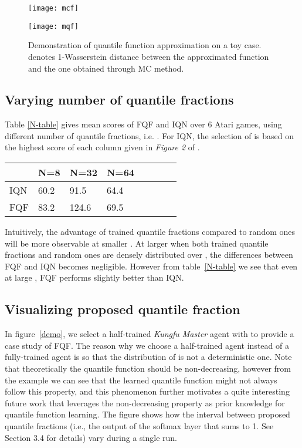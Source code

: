 \documentclass{article}
\begin{document}
\begin{figure}[!htb]
   \begin{minipage}{0.48\textwidth}
     \centering
     \texttt{[image: mcf]}
     \caption*{(a)}
   \end{minipage}\hfill
   \begin{minipage}{0.48\textwidth}
     \centering
     \texttt{[image: mqf]}
     \caption*{(b)}
   \end{minipage}
   \caption{Demonstration of quantile function approximation on a toy case.  denotes 1-Wasserstein distance between the approximated function and the one obtained through MC method.}
   \label{fig:toy}
\end{figure}

\subsection*{Varying number of quantile fractions}
Table \ref{N-table} gives mean scores of FQF and IQN over 6 Atari games, using different number of quantile fractions, i.e. . For IQN, the selection of  is based on the highest score of each column given in \textit{Figure 2} of \citep{dabney2018implicit}. 

\begin{table*}[ht!]
	\centering
    \begin{tabular}{llllllll}
		\hline \hline
		& N=8 & N=32 & N=64\\
		\midrule
		IQN & 60.2 & 91.5 & 64.4\\
		FQF & 83.2 & 124.6 & 69.5
	\end{tabular}
\caption{Mean scores across 6 Atari 2600 games, measured as percentages of human baseline. Scores are averages over 3 seeds.} \label{N-table}
\end{table*}

Intuitively, the advantage of trained quantile fractions compared to random ones will be more observable at smaller . At larger  when both trained quantile fractions and random ones are densely distributed over , the differences between FQF and IQN becomes negligible. However from table~\ref{N-table} we see that even at large , FQF performs slightly better than IQN.

\subsection*{Visualizing proposed quantile fraction}
In figure~\ref{demo}, we select a half-trained \textit{Kungfu Master} agent with  to provide a case study of FQF. The reason why we choose a half-trained agent instead of a fully-trained agent is so that the distribution of  is not a deterministic one. Note that theoretically the quantile function should be non-decreasing, however from the example we can see that the learned quantile function might not always follow this property, and this phenomenon further motivates a quite interesting future work that leverages the non-decreasing property as prior knowledge for quantile function learning. The figure shows how the interval between proposed quantile fractions (i.e., the output of the softmax layer that sums to 1. See Section 3.4 for details) vary during a single run.
\end{document}
